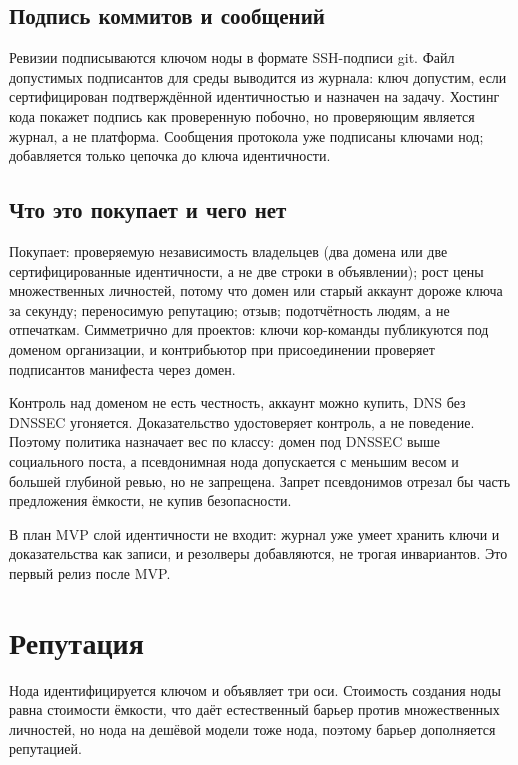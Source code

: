 \subsection{Подпись коммитов и сообщений}

Ревизии подписываются ключом ноды в формате SSH-подписи git. Файл допустимых подписантов для среды выводится из журнала: ключ допустим, если сертифицирован подтверждённой идентичностью и назначен на задачу. Хостинг кода покажет подпись как проверенную побочно, но проверяющим является журнал, а не платформа. Сообщения протокола уже подписаны ключами нод; добавляется только цепочка до ключа идентичности.

\subsection{Что это покупает и чего нет}

Покупает: проверяемую независимость владельцев (два домена или две сертифицированные идентичности, а не две строки в объявлении); рост цены множественных личностей, потому что домен или старый аккаунт дороже ключа за секунду; переносимую репутацию; отзыв; подотчётность людям, а не отпечаткам. Симметрично для проектов: ключи кор-команды публикуются под доменом организации, и контрибьютор при присоединении проверяет подписантов манифеста через домен.

\begin{warnbox}
Контроль над доменом не есть честность, аккаунт можно купить, DNS без DNSSEC угоняется. Доказательство удостоверяет контроль, а не поведение. Поэтому политика назначает вес по классу: домен под DNSSEC выше социального поста, а псевдонимная нода допускается с меньшим весом и большей глубиной ревью, но не запрещена. Запрет псевдонимов отрезал бы часть предложения ёмкости, не купив безопасности.
\end{warnbox}

В план MVP слой идентичности не входит: журнал уже умеет хранить ключи и доказательства как записи, и резолверы добавляются, не трогая инвариантов. Это первый релиз после MVP.

\section{Репутация}

Нода идентифицируется ключом и объявляет три оси. Стоимость создания ноды равна стоимости ёмкости, что даёт естественный барьер против множественных личностей, но нода на дешёвой модели тоже нода, поэтому барьер дополняется репутацией.

